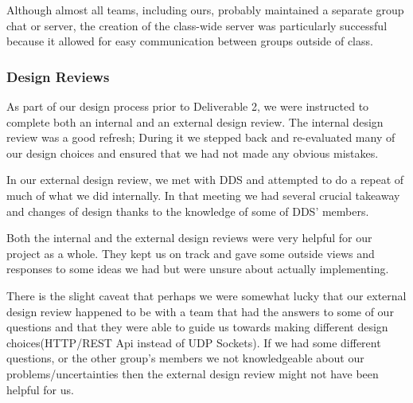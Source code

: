 Although almost all teams, including ours, probably maintained a separate group chat or server, the creation of the class-wide server was particularly successful because it allowed for easy communication between groups outside of class.

\iffalse
\smallskip\subsubsection*{README file}
Early on in our development process, Justin (team lead) created a comprehensive README file in our Git repository that outlined much of our design decisions and expectations for API calls. By having this completed and accessible, it gave us a good location to both keep all of our design decisions updated, and also to use as a reference when answering questions from other teams. In addition, it gave us a place to point other components to look at if they had any questions about formatting/expectations and none of us were available to respond.
\medbreak
The full README can be found on our project \href{https://github.com/justinottesen/LSPT-Evaluation}{GitHub Repository}.
\fi

\smallskip\subsubsection*{Design Reviews}
As part of our design process prior to Deliverable 2, we were instructed to complete both an internal and an external design review. The internal design review was a good refresh; During it we stepped back and re-evaluated many of our design choices and ensured that we had not made any obvious mistakes. 

\medskip

In our external design review, we met with DDS and attempted to do a repeat of much of what we did internally. In that meeting we had several crucial takeaway and changes of design thanks to the knowledge of some of DDS' members.

\medskip

Both the internal and the external design reviews were very helpful for our project as a whole. They kept us on track and gave some outside views and responses to some ideas we had but were unsure about actually implementing. 

\medskip

There is the slight caveat that perhaps we were somewhat lucky that our external design review happened to be with a team that had the answers to some of our questions and that they were able to guide us towards making different design choices(HTTP/REST Api instead of UDP Sockets). If we had some different questions, or the other group's members we not knowledgeable about our problems/uncertainties then the external design review might not have been helpful for us. 

